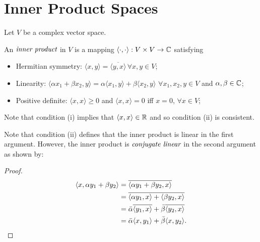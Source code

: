 
\section{Inner Product Spaces} %
\label{sec:innerproductspaces}

Let $V$ be a complex vector space.

\begin{defn}
	An $\emph{inner product}$ in $V$ is a mapping $\langle \cdot , \cdot \rangle : V \times V \to \mathbb{C}$
	satisfying
	\begin{itemize}
		\item Hermitian symmetry: $\langle x,y \rangle = \overline{\langle y,x \rangle} \, \forall x,y \in V$;
		\item Linearity:
			$\langle \alpha x_1 + \beta x_2,y \rangle = \alpha \langle x_1,y \rangle + \beta \langle x_2,y \rangle$
			$\forall x_1,x_2,y \in V$ and $\alpha , \beta \in \mathbb{C}$;
		\item Positive definite: $\langle x,x \rangle \geq 0$ and $\langle x,x \rangle =0$ iff $x=0, \, \forall x \in V$;
	\end{itemize}
\end{defn}

\begin{rem}
	Note that condition (i) implies that $\langle x,x \rangle \in \mathbb{R}$ and so condition (ii) is consistent.
\end{rem}

\begin{rem}
	Note that condition (ii) defines that the inner product is linear in the first argument. However,
	the inner product is $\emph{conjugate linear}$ in the second argument as shown by:
	\begin{proof}
		\begin{align*}
			\langle x, \alpha y_1 + \beta y_2 \rangle
			&= \overline{\langle \alpha y_1 + \beta y_2, x \rangle}
			\\
			&= \overline{\langle \alpha y_1, x \rangle + \langle \beta y_2, x \rangle}
			\\
			&= \bar{\alpha} \overline{\langle y_1, x \rangle} + \bar{\beta} \overline{\langle y_2, x \rangle}
			\\
			&= \bar{\alpha} \langle x, y_1 \rangle + \bar{\beta} \langle x, y_2 \rangle . \qedhere
		\end{align*}
	\end{proof}
\end{rem}

